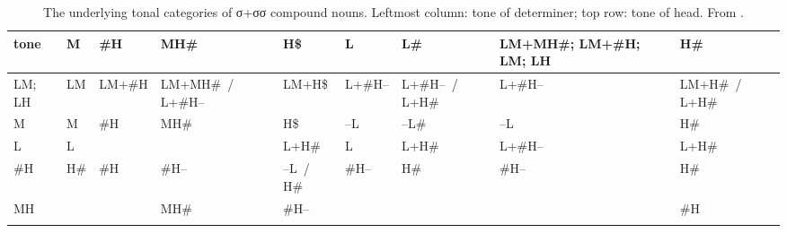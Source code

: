 \begin{refsection}
\begin{subtables}
			
\begin{sidewaystable}%
\caption{\label{tab:abstractdisyllabicmonosyllablesREF}The underlying tonal categories of σ+σσ compound nouns. Leftmost column: tone of determiner; top row: tone of head. From .}
{\renewcommand{\arraystretch}{1.35}
	{\fontsize{10}{11}\selectfont
		\begin{tabularx}{\textwidth}{ l P{7mm} P{12mm} Q l P{10mm} P{22mm} P{16mm} P{26mm} }
			\lsptoprule
			tone & M & \#H & MH\# & H\$ & L & L\# & LM+MH\#; LM+\#H; LM; LH & H\#\\\midrule
			LM; LH & LM & LM+\#H  & LM+MH\#~/ L+\#H-- & LM+H\$ & L+\#H-- & L+\#H--~/ L+H\# & L+\#H-- & LM+H\#~/ L+H\#\\
			M & M & \#H & MH\# & H\$ & --L & --L\# & --L & H\#\\
			L & L &  & \hspace*{\fill} & L+H\# & L & L+H\# & L+\#H-- & L+H\#\\
			\#H & H\# & \#H & \#H-- & --L~/ H\# & \#H-- & H\# & \#H-- & H\#\\
			MH & \hspace*{\fill} & \hspace*{\fill} &
			MH\# & \#H-- & \hspace*{\fill} & \hspace*{\fill} & \hspace*{\fill} & \#H\\
			\lspbottomrule
		\end{tabularx}
							} %
	}
\end{sidewaystable}


\end{subtables}
\end{refsection}
